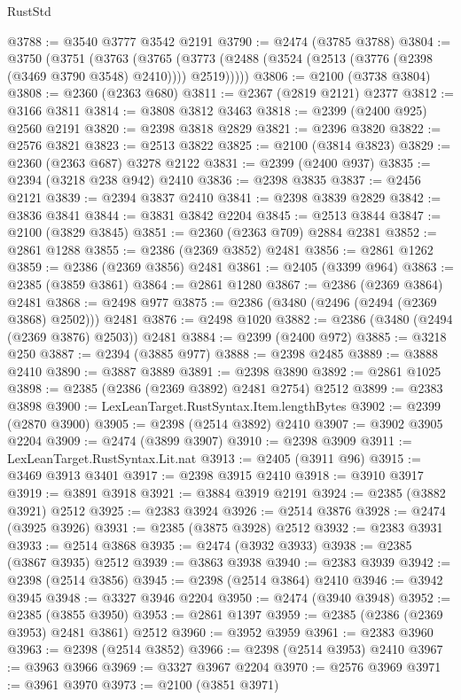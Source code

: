 \begin{lexlean}{RustStd}
\begin{coremodule}
{\begin{coremodule}
{{{{{{{{{{{{{{{{{{{{{{{{{{{{{{{{{{{{{{{{{{{{{{{{{{@3788 := @3540 @3777 @3542 @2191
@3790 := @2474 (@3785 @3788)
@3804 := @3750
    (@3751
      (@3763
        (@3765 (@3773 (@2488 (@3524 (@2513 (@3776 (@2398 (@3469 @3790 @3548) @2410)))) @2519)))))
@3806 := @2100 (@3738 @3804)
@3808 := @2360 (@2363 @680)
@3811 := @2367 (@2819 @2121) @2377
@3812 := @3166 @3811
@3814 := @3808 @3812 @3463
@3818 := @2399 (@2400 @925) @2560 @2191
@3820 := @2398 @3818 @2829
@3821 := @2396 @3820
@3822 := @2576 @3821
@3823 := @2513 @3822
@3825 := @2100 (@3814 @3823)
@3829 := @2360 (@2363 @687) @3278 @2122
@3831 := @2399 (@2400 @937)
@3835 := @2394 (@3218 @238 @942) @2410
@3836 := @2398 @3835
@3837 := @2456 @2121
@3839 := @2394 @3837 @2410
@3841 := @2398 @3839 @2829
@3842 := @3836 @3841
@3844 := @3831 @3842 @2204
@3845 := @2513 @3844
@3847 := @2100 (@3829 @3845)
@3851 := @2360 (@2363 @709) @2884 @2381
@3852 := @2861 @1288
@3855 := @2386 (@2369 @3852) @2481
@3856 := @2861 @1262
@3859 := @2386 (@2369 @3856) @2481
@3861 := @2405 (@3399 @964)
@3863 := @2385 (@3859 @3861)
@3864 := @2861 @1280
@3867 := @2386 (@2369 @3864) @2481
@3868 := @2498 @977
@3875 := @2386 (@3480 (@2496 (@2494 (@2369 @3868) @2502))) @2481
@3876 := @2498 @1020
@3882 := @2386 (@3480 (@2494 (@2369 @3876) @2503)) @2481
@3884 := @2399 (@2400 @972)
@3885 := @3218 @250
@3887 := @2394 (@3885 @977)
@3888 := @2398 @2485
@3889 := @3888 @2410
@3890 := @3887 @3889
@3891 := @2398 @3890
@3892 := @2861 @1025
@3898 := @2385 (@2386 (@2369 @3892) @2481 @2754) @2512
@3899 := @2383 @3898
@3900 := LexLeanTarget.RustSyntax.Item.lengthBytes
@3902 := @2399 (@2870 @3900)
@3905 := @2398 (@2514 @3892) @2410
@3907 := @3902 @3905 @2204
@3909 := @2474 (@3899 @3907)
@3910 := @2398 @3909
@3911 := LexLeanTarget.RustSyntax.Lit.nat
@3913 := @2405 (@3911 @96)
@3915 := @3469 @3913 @3401
@3917 := @2398 @3915 @2410
@3918 := @3910 @3917
@3919 := @3891 @3918
@3921 := @3884 @3919 @2191
@3924 := @2385 (@3882 @3921) @2512
@3925 := @2383 @3924
@3926 := @2514 @3876
@3928 := @2474 (@3925 @3926)
@3931 := @2385 (@3875 @3928) @2512
@3932 := @2383 @3931
@3933 := @2514 @3868
@3935 := @2474 (@3932 @3933)
@3938 := @2385 (@3867 @3935) @2512
@3939 := @3863 @3938
@3940 := @2383 @3939
@3942 := @2398 (@2514 @3856)
@3945 := @2398 (@2514 @3864) @2410
@3946 := @3942 @3945
@3948 := @3327 @3946 @2204
@3950 := @2474 (@3940 @3948)
@3952 := @2385 (@3855 @3950)
@3953 := @2861 @1397
@3959 := @2385 (@2386 (@2369 @3953) @2481 @3861) @2512
@3960 := @3952 @3959
@3961 := @2383 @3960
@3963 := @2398 (@2514 @3852)
@3966 := @2398 (@2514 @3953) @2410
@3967 := @3963 @3966
@3969 := @3327 @3967 @2204
@3970 := @2576 @3969
@3971 := @3961 @3970
@3973 := @2100 (@3851 @3971)
}}}}}}}}}}}}}}}}}}}}}}}}}}}}}}}}}}}}}}}}}}}}}}}}}}
\end{coremodule}}
\end{coremodule}
\end{lexlean}
